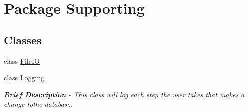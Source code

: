 \hypertarget{namespace_supporting}{}\section{Package Supporting}
\label{namespace_supporting}
\subsection*{Classes}
\begin{DoxyCompactItemize}
\item 
class \hyperlink{class_supporting_1_1_file_i_o}{File\+I\+O}
\item 
class \hyperlink{class_supporting_1_1_logging}{Logging}
\begin{DoxyCompactList}\small\item\em {\bfseries Brief Description} -\/ This class will log each step the user takes that makes a change tothe database. \end{DoxyCompactList}\end{DoxyCompactItemize}
